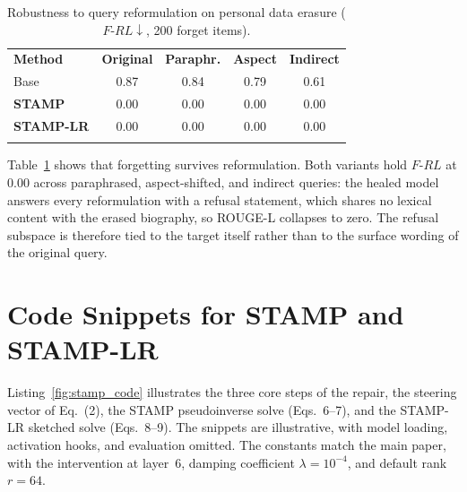 \begin{table}[H]
\centering
\caption{Robustness to query reformulation on personal data erasure ($F\text{-}RL\downarrow$, 200 forget items).}
\label{tab:robustness}
\small
\renewcommand{\arraystretch}{1.2}
\begin{tabular}{l|cccc}
\Xhline{1.15pt}
\textbf{Method} & \textbf{Original} & \textbf{Paraphr.} & \textbf{Aspect} & \textbf{Indirect} \\
\Xhline{1.15pt}
Base     & 0.87 & 0.84 & 0.79 & 0.61 \\
\textbf{STAMP}    & 0.00 & 0.00 & 0.00 & 0.00 \\
\rowcolor{gray!15}
\textbf{STAMP-LR} & 0.00 & 0.00 & 0.00 & 0.00 \\
\Xhline{1.15pt}
\end{tabular}
\end{table}

Table~\ref{tab:robustness} shows that forgetting survives reformulation. Both variants hold $F\text{-}RL$ at 0.00 across paraphrased, aspect-shifted, and indirect queries: the healed model answers every reformulation with a refusal statement, which shares no lexical content with the erased biography, so ROUGE-L collapses to zero. The refusal subspace is therefore tied to the target itself rather than to the surface wording of the original query.

\section{Code Snippets for STAMP and STAMP-LR}
\label{sup:code}
Listing~\ref{fig:stamp_code} illustrates the three core steps of the repair, the steering vector of Eq.~(2), the STAMP pseudoinverse solve (Eqs.~6--7), and the STAMP-LR sketched solve (Eqs.~8--9). The snippets are illustrative, with model loading, activation hooks, and evaluation omitted. The constants match the main paper, with the intervention at layer~6, damping coefficient $\lambda = 10^{-4}$, and default rank $r = 64$.

% 
